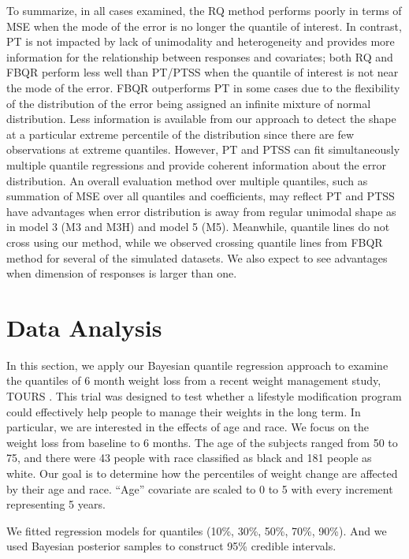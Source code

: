 \documentclass[12pt]{article}
\begin{document}
To summarize, in all cases examined, the RQ method performs poorly in terms of MSE
when the mode of the error is no longer the quantile of interest. In
contrast, PT is not impacted by lack of unimodality and heterogeneity
and provides more information for the relationship between responses
and covariates; both RQ and FBQR perform less well than PT/PTSS when the quantile of interest is not near the mode of the error. FBQR outperforms PT in some cases due to the flexibility of the distribution of the error being
assigned an infinite mixture of normal distribution. Less
information is available from our approach to detect the shape at a
particular extreme percentile of the distribution since there are few
observations at extreme quantiles. However, PT and PTSS can fit
simultaneously multiple quantile regressions and provide coherent
information about the error distribution.  An overall evaluation
method over multiple quantiles, such as summation of MSE over all
quantiles and coefficients, may reflect PT and PTSS have advantages
when error distribution is away from regular unimodal shape as in
model 3 (M3 and M3H) and model 5 (M5).  Meanwhile, quantile lines do
not cross using our method, while we observed crossing quantile lines
from FBQR method for several of the simulated datasets.  We also expect to
see advantages when dimension of responses is larger than one.


\section{Data Analysis}
\label{ch2:sec:tours}
In this section, we apply our Bayesian quantile regression approach to
examine the quantiles of 6 month weight loss from a recent weight
management study, TOURS \citep{perri2008extended}.  This trial was designed
to test whether a lifestyle modification program could effectively
help people to manage their weights in the long term.  In particular,
we are interested in the effects of age and race.  We focus on the
weight loss from baseline to 6 months. The age of the subjects ranged
from 50 to 75, and there were 43 people with race classified as black
and 181 people as white.  Our goal is to determine how the percentiles
of weight change are affected by their age and race.  ``Age''
covariate are scaled to 0 to 5 with every increment representing 5
years.

We fitted regression models for quantiles (10\%, 30\%, 50\%, 70\%,
90\%). And we used Bayesian posterior samples to construct 95\%
credible intervals.
\end{document}
